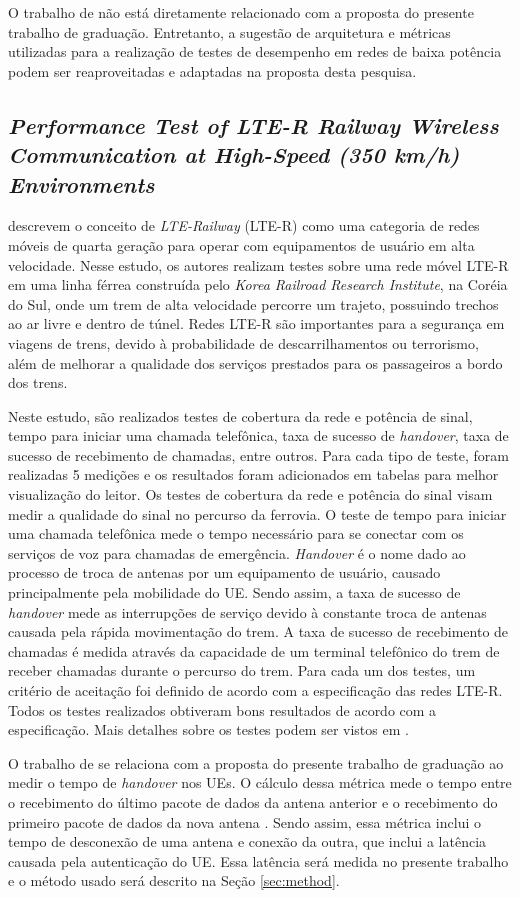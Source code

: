 O trabalho de \cite{Boano2018} não está diretamente relacionado com a proposta do presente trabalho de graduação.
Entretanto, a sugestão de arquitetura e métricas utilizadas para a realização de testes de desempenho em redes de baixa potência podem ser reaproveitadas e adaptadas na proposta desta pesquisa.

\subsection{\textit{Performance Test of LTE-R Railway Wireless Communication at High-Speed (350 km/h) Environments}}

\cite{MahnSuk2018} descrevem o conceito de \textit{LTE-Railway} (LTE-R) como uma categoria de redes móveis de quarta geração para operar com equipamentos de usuário em alta velocidade.
Nesse estudo, os autores realizam testes sobre uma rede móvel LTE-R em uma linha férrea construída pelo \textit{Korea Railroad Research Institute}, na Coréia do Sul, onde um trem de alta velocidade percorre um trajeto, possuindo trechos ao ar livre e dentro de túnel.
Redes LTE-R são importantes para a segurança em viagens de trens, devido à probabilidade de descarrilhamentos ou terrorismo, além de melhorar a qualidade dos serviços prestados para os passageiros a bordo dos trens.

Neste estudo, são realizados testes de cobertura da rede e potência de sinal, tempo para iniciar uma chamada telefônica, taxa de sucesso de \textit{handover}, taxa de sucesso de recebimento de chamadas, entre outros.
Para cada tipo de teste, foram realizadas 5 medições e os resultados foram adicionados em tabelas para melhor visualização do leitor.
Os testes de cobertura da rede e potência do sinal visam medir a qualidade do sinal no percurso da ferrovia.
O teste de tempo para iniciar uma chamada telefônica mede o tempo necessário para se conectar com os serviços de voz para chamadas de emergência.
\textit{Handover} é o nome dado ao processo de troca de antenas por um equipamento de usuário, causado principalmente pela mobilidade do UE. Sendo assim, a taxa de sucesso de \textit{handover} mede as interrupções de serviço devido à constante troca de antenas causada pela rápida movimentação do trem.
A taxa de sucesso de recebimento de chamadas é medida através da capacidade de um terminal telefônico do trem de receber chamadas durante o percurso do trem.
Para cada um dos testes, um critério de aceitação foi definido de acordo com a especificação das redes LTE-R. Todos os testes realizados obtiveram bons resultados de acordo com a especificação. Mais detalhes sobre os testes podem ser vistos em \cite{MahnSuk2018}.

O trabalho de \cite{MahnSuk2018} se relaciona com a proposta do presente trabalho de graduação ao medir o tempo de \textit{handover} nos UEs.
O cálculo dessa métrica mede o tempo entre o recebimento do último pacote de dados da antena anterior e o recebimento do primeiro pacote de dados da nova antena \cite{Tayyab2019}.
Sendo assim, essa métrica inclui o tempo de desconexão de uma antena e conexão da outra, que inclui a latência causada pela autenticação do UE.
Essa latência será medida no presente trabalho e o método usado será descrito na Seção \ref{sec:method}.

